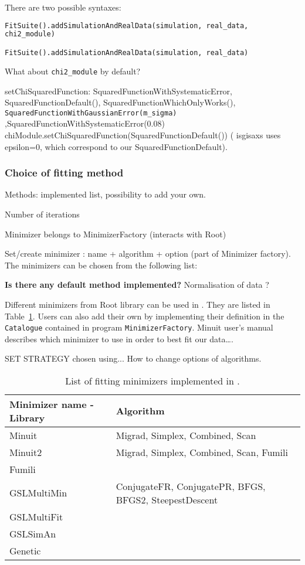 There are two possible syntaxes: 
\begin{lstlisting}[language=python, style=eclipse,numbers=none]
FitSuite().addSimulationAndRealData(simulation, real_data,
chi2_module)

FitSuite().addSimulationAndRealData(simulation, real_data)
\end{lstlisting}


What about \texttt{chi2\_module} by default?

setChiSquaredFunction: SquaredFunctionWithSystematicError, SquaredFunctionDefault(), SquaredFunctionWhichOnlyWorks(),
\texttt{SquaredFunctionWithGaussianError(m\_sigma)}
,SquaredFunctionWithSystematicError(0.08) 
chiModule.setChiSquaredFunction(SquaredFunctionDefault()) ( isgisaxs
uses epsilon=0, which correspond to our SquaredFunctionDefault). 


\subsubsection{Choice of fitting method}
Methods: implemented list, possibility to add your own.

Number of iterations

Minimizer belongs to MinimizerFactory (interacts with Root)

Set/create minimizer : name + algorithm + option (part of Minimizer
factory). The minimizers can be chosen from the following list:


\textbf{Is there any default method implemented?}
Normalisation of data ?


Different minimizers from Root library can be used in \BornAgain. They are listed in
Table~\ref{table:fit_minimizers}. Users can also add their own by
implementing their definition in the \texttt{Catalogue} contained in
program \texttt{MinimizerFactory}.
Minuit user's manual describes which minimizer to use in order to best
fit our data\ldots  \cite{MinuitRoot}.

SET STRATEGY chosen using...
How to change options of algorithms.

\begin{table}[h]
\centering
\begin{tabular}{@{}ll@{}}
\hline
\hline
\textbf{Minimizer name - Library} & \textbf{Algorithm} \\
\hline
Minuit & Migrad, Simplex, Combined, Scan\\
Minuit2 & Migrad, Simplex, Combined, Scan, Fumili \\
Fumili & \\
GSLMultiMin & ConjugateFR, ConjugatePR, BFGS, BFGS2, SteepestDescent \\
GSLMultiFit & \\
GSLSimAn & \\ %
Genetic &  \\ %
\hline
\hline
\end{tabular}
\label{table:fit_minimizers}
\caption{List of fitting minimizers implemented in \BornAgain.}
\end{table}

